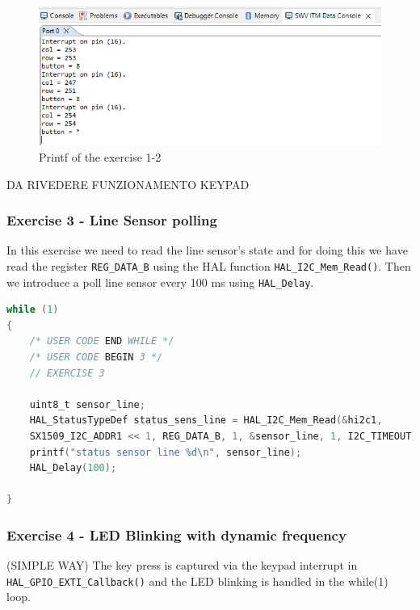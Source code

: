 \begin{figure}[H]
    \centering
    \includegraphics[width=0.75\linewidth]{lab1-2/figures/exercise3.1-3.2.PNG}
    \caption{Printf of the exercise 1-2}
    \label{fig:ex3.2}
\end{figure}


DA RIVEDERE FUNZIONAMENTO KEYPAD

\subsubsection{Exercise 3 - Line Sensor polling}

In this exercise we need to read the line sensor's state and for doing this we have read the register \texttt{REG\_DATA\_B} using the HAL function \texttt{HAL\_I2C\_Mem\_Read()}. Then we introduce a poll line sensor every 100 ms using \texttt{HAL\_Delay}.

\bigskip

\begin{lstlisting}[language=C]
while (1)
{
    /* USER CODE END WHILE */
    /* USER CODE BEGIN 3 */
    // EXERCISE 3
    
    uint8_t sensor_line;
    HAL_StatusTypeDef status_sens_line = HAL_I2C_Mem_Read(&hi2c1, 
    SX1509_I2C_ADDR1 << 1, REG_DATA_B, 1, &sensor_line, 1, I2C_TIMEOUT);
    printf("status sensor line %d\n", sensor_line);
    HAL_Delay(100);

}

\end{lstlisting}

\subsubsection{Exercise 4 - LED Blinking with dynamic frequency}


(SIMPLE WAY)
\noindent
The key press is captured via the keypad interrupt in \texttt{HAL\_GPIO\_EXTI\_Callback()} and the LED blinking is handled in the while(1) loop.

\bigskip

